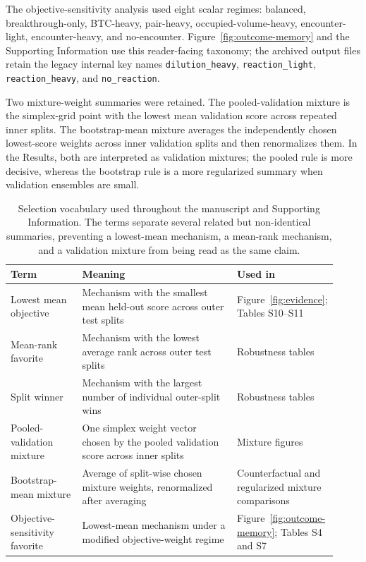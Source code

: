 \documentclass[11pt]{article}
\begin{document}
The objective-sensitivity analysis used eight scalar regimes: balanced, breakthrough-only, BTC-heavy, pair-heavy, occupied-volume-heavy, encounter-light, encounter-heavy, and no-encounter. Figure~\ref{fig:outcome-memory} and the Supporting Information use this reader-facing taxonomy; the archived output files retain the legacy internal key names \texttt{dilution\_heavy}, \texttt{reaction\_light}, \texttt{reaction\_heavy}, and \texttt{no\_reaction}.

Two mixture-weight summaries were retained. The pooled-validation mixture is the simplex-grid point with the lowest mean validation score across repeated inner splits. The bootstrap-mean mixture averages the independently chosen lowest-score weights across inner validation splits and then renormalizes them. In the Results, both are interpreted as validation mixtures; the pooled rule is more decisive, whereas the bootstrap rule is a more regularized summary when validation ensembles are small.

\begin{table}[!htbp]
\centering
\caption{Selection vocabulary used throughout the manuscript and Supporting Information. The terms separate several related but non-identical summaries, preventing a lowest-mean mechanism, a mean-rank mechanism, and a validation mixture from being read as the same claim.}
\label{tab:selection-vocabulary}
\scriptsize
\begin{tabular}{@{}L{0.22\linewidth}L{0.48\linewidth}L{0.22\linewidth}@{}}
\toprule
Term & Meaning & Used in \\
\midrule
Lowest mean objective & Mechanism with the smallest mean held-out score across outer test splits & Figure~\ref{fig:evidence}; Tables S10--S11 \\
Mean-rank favorite & Mechanism with the lowest average rank across outer test splits & Robustness tables \\
Split winner & Mechanism with the largest number of individual outer-split wins & Robustness tables \\
Pooled-validation mixture & One simplex weight vector chosen by the pooled validation score across inner splits & Mixture figures \\
Bootstrap-mean mixture & Average of split-wise chosen mixture weights, renormalized after averaging & Counterfactual and regularized mixture comparisons \\
Objective-sensitivity favorite & Lowest-mean mechanism under a modified objective-weight regime & Figure~\ref{fig:outcome-memory}; Tables S4 and S7 \\
\bottomrule
\end{tabular}
\end{table}
\end{document}
